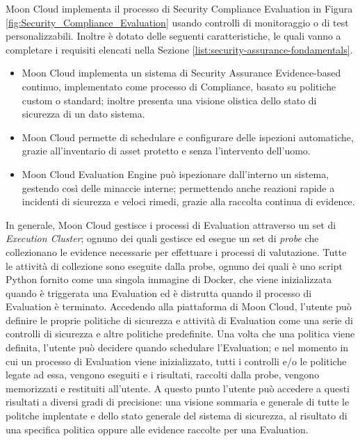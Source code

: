 Moon Cloud implementa il processo di Security Compliance Evaluation in Figura \ref{fig:Security_Compliance_Evaluation} usando controlli 
di monitoraggio o di test personalizzabili. Inoltre è dotato delle seguenti caratteristiche, le quali vanno a completare i requisiti 
elencati nella Sezione \ref{list:security-assurance-fondamentals}.
\begin{itemize}
    \item Moon Cloud implementa un sistema di Security Assurance Evidence-based continuo, implementato come processo di Compliance,
    basato su politiche custom o standard; inoltre presenta una visione olistica dello stato di sicurezza di un dato sistema.
    \item Moon Cloud permette di schedulare e configurare delle ispezioni automatiche, grazie all'inventario di asset protetto e senza
    l'intervento dell'uomo.
    \item Moon Cloud Evaluation Engine può ispezionare dall'interno un sistema, gestendo così delle minaccie interne; permettendo anche 
    reazioni rapide a incidenti di sicurezza e veloci rimedi, grazie alla raccolta continua di evidence.
\end{itemize}
In generale, Moon Cloud gestisce i processi di Evaluation attraverso un set di \textit{Execution Cluster}; ognuno dei quali gestisce 
ed esegue un set di \textit{probe} che collezionano le evidence necessarie per effettuare i processi di valutazione. 
Tutte le attività di collezione sono eseguite dalla probe, ognuno dei quali è uno script Python fornito come una singola immagine di Docker, 
che viene inizializzata quando è triggerata una Evaluation ed è distrutta quando il processo di Evaluation è terminato.\hfill\break
Accedendo alla piattaforma di Moon Cloud, l'utente può definire le proprie politiche di sicurezza e attività di Evaluation come 
una serie di controlli di sicurezza e altre politiche predefinite. Una volta che una politica viene definita, l'utente può 
decidere quando schedulare l'Evaluation; e nel momento in cui un processo di Evaluation viene inizializzato, tutti i controlli e/o le 
politiche legate ad essa, vengono eseguiti e i risultati, raccolti dalla probe, vengono memorizzati e restituiti all'utente. 
A questo punto l'utente può accedere a questi risultati a diversi gradi di precisione: una visione sommaria e generale di tutte le 
politche implentate e dello stato generale del sistema di sicurezza, al risultato di una specifica politica oppure alle evidence 
raccolte per una Evaluation.\hfill\break
%
\vspace{0.5 cm}
